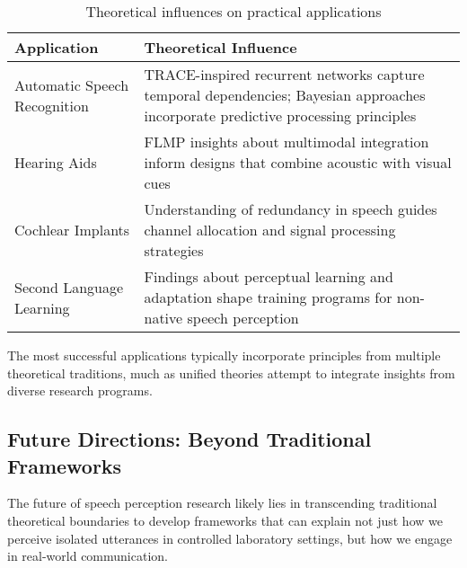 \documentclass[12pt,a4paper]{article}
\begin{document}
\begin{table}[h]
\centering
\begin{tabular}{|p{4cm}|p{8cm}|}
\hline
\textbf{Application} & \textbf{Theoretical Influence} \\
\hline
Automatic Speech Recognition & TRACE-inspired recurrent networks capture temporal dependencies; Bayesian approaches incorporate predictive processing principles \\
\hline
Hearing Aids & FLMP insights about multimodal integration inform designs that combine acoustic with visual cues \\
\hline
Cochlear Implants & Understanding of redundancy in speech guides channel allocation and signal processing strategies \\
\hline
Second Language Learning & Findings about perceptual learning and adaptation shape training programs for non-native speech perception \\
\hline
\end{tabular}
\caption{Theoretical influences on practical applications}
\label{tbl:applications}
\end{table}

The most successful applications typically incorporate principles from multiple theoretical traditions, much as unified theories attempt to integrate insights from diverse research programs.

\subsection{Future Directions: Beyond Traditional Frameworks}

The future of speech perception research likely lies in transcending traditional theoretical boundaries to develop frameworks that can explain not just how we perceive isolated utterances in controlled laboratory settings, but how we engage in real-world communication.
\end{document}
